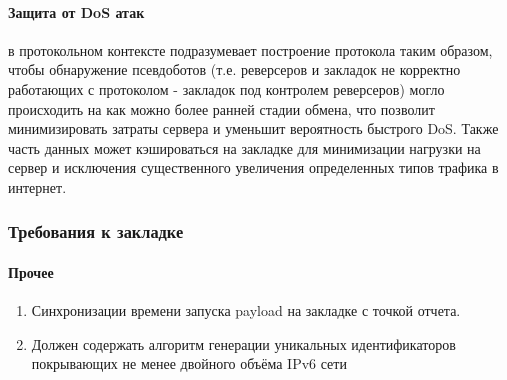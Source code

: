 \paragraph{Защита от DoS атак} в протокольном контексте подразумевает построение протокола таким образом,
 чтобы обнаружение псевдоботов (т.е. реверсеров и закладок не корректно работающих с протоколом - закладок
 под контролем реверсеров) могло происходить на как можно более ранней стадии обмена, что позволит
 минимизировать затраты сервера и уменьшит вероятность быстрого DoS. Также часть данных может кэшироваться
 на закладке для минимизации нагрузки на сервер и исключения существенного увеличения определенных типов
 трафика в интернет.

\subsubsection{Требования к закладке}

\paragraph{Прочее\\}
\begin{enumerate}
\item{Синхронизации времени запуска payload на закладке с точкой отчета.}
\item{Должен содержать алгоритм генерации уникальных идентификаторов покрывающих не менее двойного объёма IPv6 сети}
\end{enumerate}

